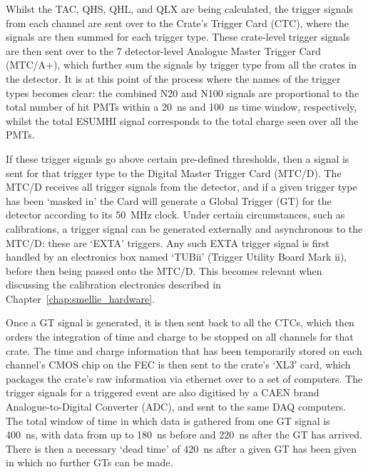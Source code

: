 Whilst the TAC, QHS, QHL, and QLX are being calculated, the trigger signals from each channel are sent over to the Crate's Trigger Card (CTC), where the signals are then summed for each trigger type. These crate-level trigger signals are then sent over to the 7 detector-level Analogue Master Trigger Card (MTC/A+), which further sum the signals by trigger type from all the crates in the detector. It is at this point of the process where the names of the trigger types becomes clear: the combined N20 and N100 signals are proportional to the total number of hit PMTs within a \SI{20}{\ns} and \SI{100}{\ns} time window, respectively, whilst the total ESUMHI signal corresponds to the total charge seen over all the PMTs.

If these trigger signals go above certain pre-defined thresholds, then a signal is sent for that trigger type to the Digital Master Trigger Card (MTC/D). The MTC/D receives all trigger signals from the detector, and if a given trigger type has been `masked in' the Card will generate a Global Trigger (GT) for the detector according to its \SI{50}{\MHz} clock. Under certain circumstances, such as calibrations, a trigger signal can be generated externally and asynchronous to the MTC/D: these are `EXTA' triggers. Any such EXTA trigger signal is first handled by an electronics box named `TUBii' (Trigger Utility Board Mark ii), before then being passed onto the MTC/D. This becomes relevant when discussing the calibration electronics described in Chapter~\ref{chap:smellie_hardware}.

Once a GT signal is generated, it is then sent back to all the CTCs, which then orders the integration of time and charge to be stopped on all channels for that crate. The time and charge information that has been temporarily stored on each channel's CMOS chip on the FEC is then sent to the crate's `XL3' card, which packages the crate's raw information via ethernet over to a set of computers. The trigger signals for a triggered event are also digitised by a CAEN brand Analogue-to-Digital Converter (ADC), and sent to the same DAQ computers. The total window of time in which data is gathered from one GT signal is \SI{400}{\ns}, with data from up to \SI{180}{\ns} before and \SI{220}{\ns} after the GT has arrived. There is then a necessary `dead time' of \SI{420}{\ns} after a given GT has been given in which no further GTs can be made.

